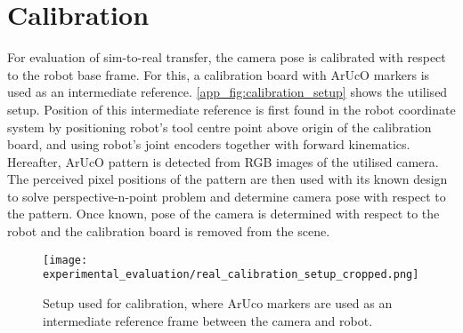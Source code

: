 \section{Calibration}\label{app:calibration}

For evaluation of sim-to-real transfer, the camera pose is calibrated with respect to the robot base frame. For this, a calibration board with ArUcO markers \cite{garrido-jurado_automatic_2014} is used as an intermediate reference. \autoref{app_fig:calibration_setup} shows the utilised setup. Position of this intermediate reference is first found in the robot coordinate system by positioning robot's tool centre point above origin of the calibration board, and using robot's joint encoders together with forward kinematics. Hereafter, ArUcO pattern is detected from RGB images of the utilised camera. The perceived pixel positions of the pattern are then used with its known design to solve perspective-n-point problem and determine camera pose with respect to the pattern. Once known, pose of the camera is determined with respect to the robot and the calibration board is removed from the scene.

\setcounter{figure}{0}
\begin{figure}[ht]
    \centering
    \texttt{[image: experimental\_evaluation/real\_calibration\_setup\_cropped.png]}
    \caption{Setup used for calibration, where ArUco markers are used as an intermediate reference frame between the camera and robot.}
    \label{app_fig:calibration_setup}
\end{figure}
